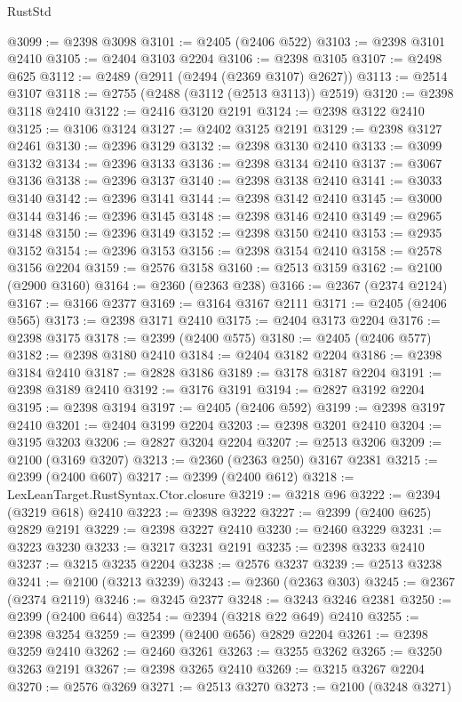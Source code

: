 \begin{lexlean}{RustStd}
\begin{coremodule}
{\begin{coremodule}
{{{{{{{{{{{{{{{{{{{{{{{{{{{{{{{{{{{{{{{{{{{{{{{{{{@3099 := @2398 @3098
@3101 := @2405 (@2406 @522)
@3103 := @2398 @3101 @2410
@3105 := @2404 @3103 @2204
@3106 := @2398 @3105
@3107 := @2498 @625
@3112 := @2489 (@2911 (@2494 (@2369 @3107) @2627))
@3113 := @2514 @3107
@3118 := @2755 (@2488 (@3112 (@2513 @3113)) @2519)
@3120 := @2398 @3118 @2410
@3122 := @2416 @3120 @2191
@3124 := @2398 @3122 @2410
@3125 := @3106 @3124
@3127 := @2402 @3125 @2191
@3129 := @2398 @3127 @2461
@3130 := @2396 @3129
@3132 := @2398 @3130 @2410
@3133 := @3099 @3132
@3134 := @2396 @3133
@3136 := @2398 @3134 @2410
@3137 := @3067 @3136
@3138 := @2396 @3137
@3140 := @2398 @3138 @2410
@3141 := @3033 @3140
@3142 := @2396 @3141
@3144 := @2398 @3142 @2410
@3145 := @3000 @3144
@3146 := @2396 @3145
@3148 := @2398 @3146 @2410
@3149 := @2965 @3148
@3150 := @2396 @3149
@3152 := @2398 @3150 @2410
@3153 := @2935 @3152
@3154 := @2396 @3153
@3156 := @2398 @3154 @2410
@3158 := @2578 @3156 @2204
@3159 := @2576 @3158
@3160 := @2513 @3159
@3162 := @2100 (@2900 @3160)
@3164 := @2360 (@2363 @238)
@3166 := @2367 (@2374 @2124)
@3167 := @3166 @2377
@3169 := @3164 @3167 @2111
@3171 := @2405 (@2406 @565)
@3173 := @2398 @3171 @2410
@3175 := @2404 @3173 @2204
@3176 := @2398 @3175
@3178 := @2399 (@2400 @575)
@3180 := @2405 (@2406 @577)
@3182 := @2398 @3180 @2410
@3184 := @2404 @3182 @2204
@3186 := @2398 @3184 @2410
@3187 := @2828 @3186
@3189 := @3178 @3187 @2204
@3191 := @2398 @3189 @2410
@3192 := @3176 @3191
@3194 := @2827 @3192 @2204
@3195 := @2398 @3194
@3197 := @2405 (@2406 @592)
@3199 := @2398 @3197 @2410
@3201 := @2404 @3199 @2204
@3203 := @2398 @3201 @2410
@3204 := @3195 @3203
@3206 := @2827 @3204 @2204
@3207 := @2513 @3206
@3209 := @2100 (@3169 @3207)
@3213 := @2360 (@2363 @250) @3167 @2381
@3215 := @2399 (@2400 @607)
@3217 := @2399 (@2400 @612)
@3218 := LexLeanTarget.RustSyntax.Ctor.closure
@3219 := @3218 @96
@3222 := @2394 (@3219 @618) @2410
@3223 := @2398 @3222
@3227 := @2399 (@2400 @625) @2829 @2191
@3229 := @2398 @3227 @2410
@3230 := @2460 @3229
@3231 := @3223 @3230
@3233 := @3217 @3231 @2191
@3235 := @2398 @3233 @2410
@3237 := @3215 @3235 @2204
@3238 := @2576 @3237
@3239 := @2513 @3238
@3241 := @2100 (@3213 @3239)
@3243 := @2360 (@2363 @303)
@3245 := @2367 (@2374 @2119)
@3246 := @3245 @2377
@3248 := @3243 @3246 @2381
@3250 := @2399 (@2400 @644)
@3254 := @2394 (@3218 @22 @649) @2410
@3255 := @2398 @3254
@3259 := @2399 (@2400 @656) @2829 @2204
@3261 := @2398 @3259 @2410
@3262 := @2460 @3261
@3263 := @3255 @3262
@3265 := @3250 @3263 @2191
@3267 := @2398 @3265 @2410
@3269 := @3215 @3267 @2204
@3270 := @2576 @3269
@3271 := @2513 @3270
@3273 := @2100 (@3248 @3271)
}}}}}}}}}}}}}}}}}}}}}}}}}}}}}}}}}}}}}}}}}}}}}}}}}}
\end{coremodule}}
\end{coremodule}
\end{lexlean}
